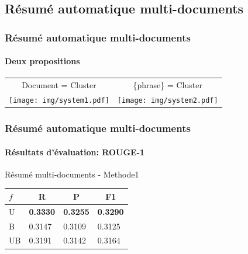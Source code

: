 \documentclass{beamer}
\begin{document}
\subsection{Résumé automatique multi-documents}

\begin{frame}
\frametitle{Résumé automatique multi-documents}
\framesubtitle{Deux propositions}
\begin{tabular}{cc}
Document = Cluster & \{phrase\} = Cluster \\
\texttt{[image: img/system1.pdf]} &
\texttt{[image: img/system2.pdf]}
\end{tabular}
\end{frame}

\begin{frame}
\frametitle{Résumé automatique multi-documents}
\framesubtitle{Résultats d'évaluation: ROUGE-1}

\begin{block}{Résumé multi-documents - Methode1}
\begin{center}
\begin{tabular}{llll}
\hline \hline
$ f $	& \multicolumn{1}{c}{R}		& \multicolumn{1}{c}{P}	& \multicolumn{1}{c}{F1}	\\
\hline
U	& \textbf{0.3330}	& \textbf{0.3255}	& \textbf{0.3290} \\
B	& 0.3147	& 0.3109	& 0.3125	\\
UB	& 0.3191	& 0.3142	& 0.3164	 \\
\hline \hline
\end{tabular}
\end{center}
\end{block}
\end{frame}
\end{document}
